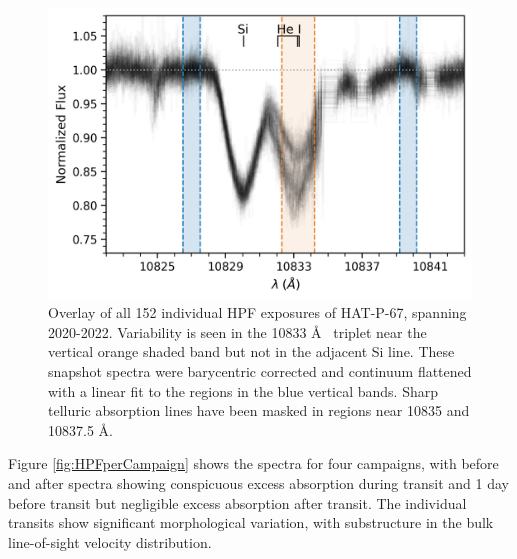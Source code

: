 \documentclass[linenumbers, twocolumn, trackchanges]{aastex631}
\begin{document}
\begin{figure}
  \includegraphics[width=\linewidth]{HAT_P_67b_He_spectrum.png}
  \caption{Overlay of all 152 individual HPF exposures of HAT-P-67, spanning 2020-2022. Variability is seen in the  10833 \AA~ triplet near the vertical orange shaded band but not in the adjacent Si line.  These snapshot spectra were barycentric corrected and continuum flattened with a linear fit to the regions in the blue vertical bands.  Sharp telluric absorption lines have been masked in regions near 10835 and 10837.5 \AA.}
  \label{fig:HPFheliumOverview}
\end{figure}

Figure \ref{fig:HPFperCampaign} shows the spectra for four campaigns, with before and after spectra showing conspicuous excess absorption during transit and 1 day before transit but negligible excess absorption after transit.  The individual transits show significant morphological variation, with substructure in the bulk line-of-sight velocity distribution.
\end{document}
